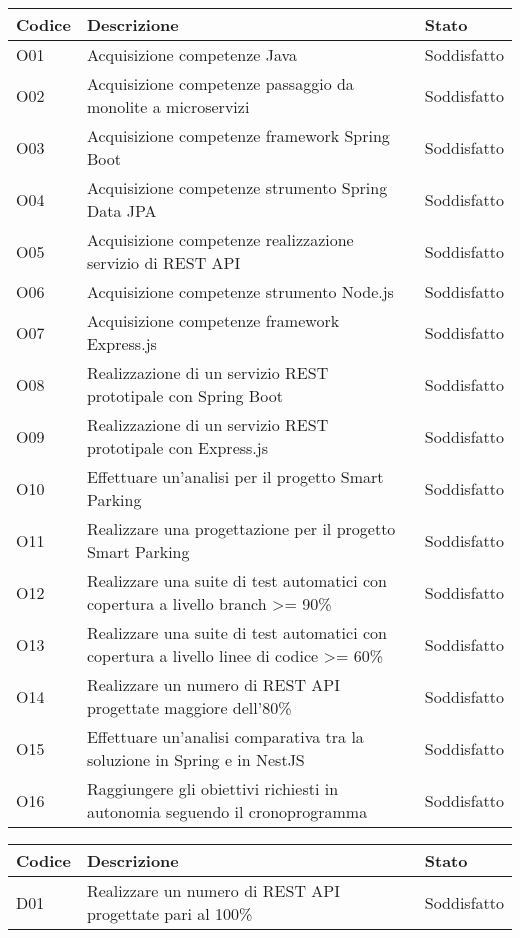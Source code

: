 \begin{table}
    \begin{tabular}{|p{1.5cm}|p{7.7cm}|p{2cm}|} 
    \hline
    Codice & Descrizione  & Stato \\ 
    \hline
    O01 & Acquisizione competenze Java & Soddisfatto \\
    \hline
    O02 & Acquisizione competenze passaggio da monolite a microservizi & Soddisfatto \\
    \hline
    O03 & Acquisizione competenze framework Spring Boot & Soddisfatto \\
    \hline
    O04 & Acquisizione competenze strumento Spring Data JPA & Soddisfatto \\
    \hline
    O05 & Acquisizione competenze realizzazione servizio di REST API & Soddisfatto \\
    \hline
    O06 & Acquisizione competenze strumento Node.js & Soddisfatto \\
    \hline
    O07 & Acquisizione competenze framework Express.js & Soddisfatto \\
    \hline
    O08 & Realizzazione di un servizio REST prototipale con Spring Boot & Soddisfatto \\
    \hline
    O09 & Realizzazione di un servizio REST prototipale con Express.js & Soddisfatto \\
    \hline
    O10 & Effettuare un'analisi per il progetto Smart Parking & Soddisfatto \\
    \hline
    O11 & Realizzare una progettazione per il progetto Smart Parking & Soddisfatto \\
    \hline
    O12 & Realizzare una suite di test automatici con copertura a livello branch >= 90\% & Soddisfatto \\
    \hline
    O13 & Realizzare una suite di test automatici con copertura a livello linee di codice >= 60\% & Soddisfatto \\
    \hline
    O14 & Realizzare un numero di REST API progettate maggiore dell'80\% & Soddisfatto \\
    \hline
    O15 & Effettuare un'analisi comparativa tra la soluzione in Spring e in NestJS & Soddisfatto \\
    \hline
    O16 & Raggiungere gli obiettivi richiesti in autonomia seguendo il cronoprogramma & Soddisfatto \\
    \hline
    \end{tabular}
\end{table}

\leavevmode\newline
\begin{table}
    \begin{tabular}{|p{1.5cm}|p{7.7cm}|p{2cm}|} 
    \hline
    Codice & Descrizione  & Stato \\ 
    \hline
    D01 & Realizzare un numero di REST API progettate pari al 100\%  & Soddisfatto \\
    \hline
    \end{tabular}
\end{table}

